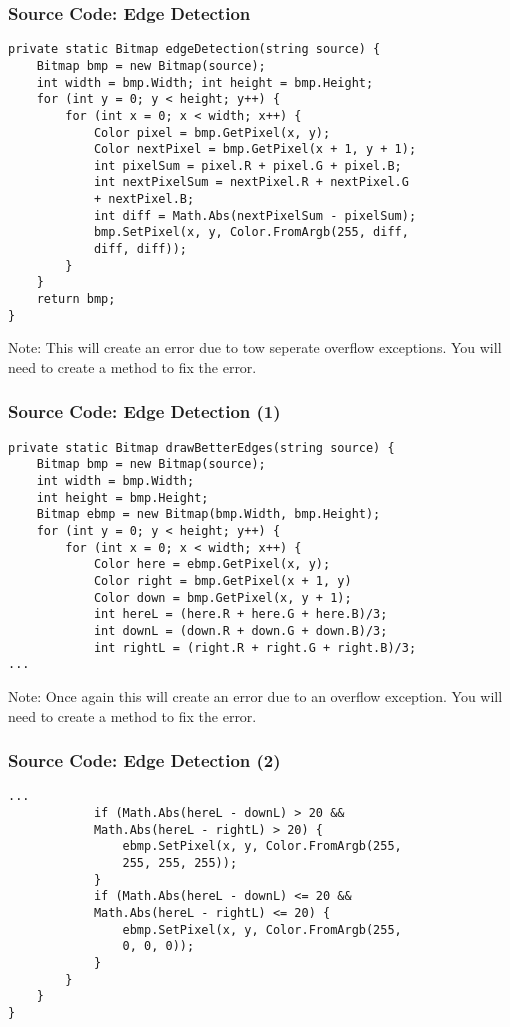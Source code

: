 \begin{frame}[fragile]
	\frametitle{Source Code: Edge Detection}
	
\begin{lstlisting}
private static Bitmap edgeDetection(string source) {  
	Bitmap bmp = new Bitmap(source);
	int width = bmp.Width; int height = bmp.Height;  
	for (int y = 0; y < height; y++) {
		for (int x = 0; x < width; x++) {
			Color pixel = bmp.GetPixel(x, y);
			Color nextPixel = bmp.GetPixel(x + 1, y + 1);
			int pixelSum = pixel.R + pixel.G + pixel.B;
			int nextPixelSum = nextPixel.R + nextPixel.G
			+ nextPixel.B;
			int diff = Math.Abs(nextPixelSum - pixelSum);
			bmp.SetPixel(x, y, Color.FromArgb(255, diff, 
			diff, diff));
		}
	}
	return bmp;
}
\end{lstlisting}

\small Note: This will create an error due to tow seperate overflow exceptions. You will need to create a method to fix the error.

\end{frame}


\begin{frame}[fragile]
	\frametitle{Source Code: Edge Detection (1)}
	
\begin{lstlisting}
private static Bitmap drawBetterEdges(string source) {  
	Bitmap bmp = new Bitmap(source);
	int width = bmp.Width;
	int height = bmp.Height;
	Bitmap ebmp = new Bitmap(bmp.Width, bmp.Height);
	for (int y = 0; y < height; y++) {
		for (int x = 0; x < width; x++)	{
			Color here = ebmp.GetPixel(x, y);
			Color right = bmp.GetPixel(x + 1, y)
			Color down = bmp.GetPixel(x, y + 1);
			int hereL = (here.R + here.G + here.B)/3;
			int downL = (down.R + down.G + down.B)/3;
			int rightL = (right.R + right.G + right.B)/3;
...
\end{lstlisting}

Note: Once again this will create an error due to an overflow exception. You will need to create a method to fix the error.

\end{frame}

\begin{frame}[fragile]
	\frametitle{Source Code: Edge Detection (2)}
	
\begin{lstlisting}
...
			if (Math.Abs(hereL - downL) > 20 && 
			Math.Abs(hereL - rightL) > 20) {
				ebmp.SetPixel(x, y, Color.FromArgb(255, 
				255, 255, 255));
			}
			if (Math.Abs(hereL - downL) <= 20 && 
			Math.Abs(hereL - rightL) <= 20) {
				ebmp.SetPixel(x, y, Color.FromArgb(255, 
				0, 0, 0));
			}	
		}	
	}
}

\end{lstlisting}

\end{frame}

